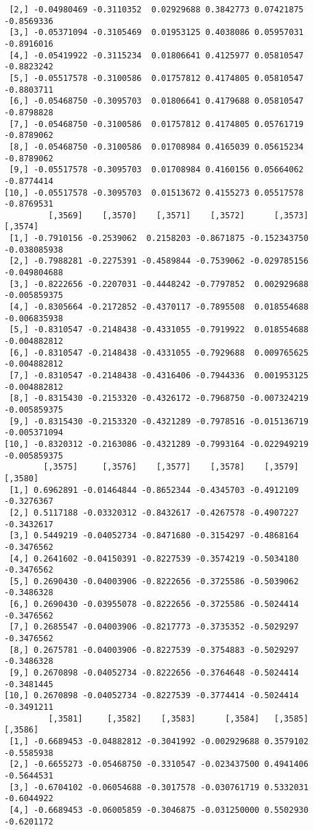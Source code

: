 \documentclass[
  letterpaper,
  DIV=11,
  numbers=noendperiod]{scrreprt}
\begin{document}
\begin{verbatim}
 [2,] -0.04980469 -0.3110352  0.02929688 0.3842773 0.07421875 -0.8569336
 [3,] -0.05371094 -0.3105469  0.01953125 0.4038086 0.05957031 -0.8916016
 [4,] -0.05419922 -0.3115234  0.01806641 0.4125977 0.05810547 -0.8823242
 [5,] -0.05517578 -0.3100586  0.01757812 0.4174805 0.05810547 -0.8803711
 [6,] -0.05468750 -0.3095703  0.01806641 0.4179688 0.05810547 -0.8798828
 [7,] -0.05468750 -0.3100586  0.01757812 0.4174805 0.05761719 -0.8789062
 [8,] -0.05468750 -0.3100586  0.01708984 0.4165039 0.05615234 -0.8789062
 [9,] -0.05517578 -0.3095703  0.01708984 0.4160156 0.05664062 -0.8774414
[10,] -0.05517578 -0.3095703  0.01513672 0.4155273 0.05517578 -0.8769531
         [,3569]    [,3570]    [,3571]    [,3572]      [,3573]      [,3574]
 [1,] -0.7910156 -0.2539062  0.2158203 -0.8671875 -0.152343750 -0.038085938
 [2,] -0.7988281 -0.2275391 -0.4589844 -0.7539062 -0.029785156 -0.049804688
 [3,] -0.8222656 -0.2207031 -0.4448242 -0.7797852  0.002929688 -0.005859375
 [4,] -0.8305664 -0.2172852 -0.4370117 -0.7895508  0.018554688 -0.006835938
 [5,] -0.8310547 -0.2148438 -0.4331055 -0.7919922  0.018554688 -0.004882812
 [6,] -0.8310547 -0.2148438 -0.4331055 -0.7929688  0.009765625 -0.004882812
 [7,] -0.8310547 -0.2148438 -0.4316406 -0.7944336  0.001953125 -0.004882812
 [8,] -0.8315430 -0.2153320 -0.4326172 -0.7968750 -0.007324219 -0.005859375
 [9,] -0.8315430 -0.2153320 -0.4321289 -0.7978516 -0.015136719 -0.005371094
[10,] -0.8320312 -0.2163086 -0.4321289 -0.7993164 -0.022949219 -0.005859375
        [,3575]     [,3576]    [,3577]    [,3578]    [,3579]    [,3580]
 [1,] 0.6962891 -0.01464844 -0.8652344 -0.4345703 -0.4912109 -0.3276367
 [2,] 0.5117188 -0.03320312 -0.8432617 -0.4267578 -0.4907227 -0.3432617
 [3,] 0.5449219 -0.04052734 -0.8471680 -0.3154297 -0.4868164 -0.3476562
 [4,] 0.2641602 -0.04150391 -0.8227539 -0.3574219 -0.5034180 -0.3476562
 [5,] 0.2690430 -0.04003906 -0.8222656 -0.3725586 -0.5039062 -0.3486328
 [6,] 0.2690430 -0.03955078 -0.8222656 -0.3725586 -0.5024414 -0.3476562
 [7,] 0.2685547 -0.04003906 -0.8217773 -0.3735352 -0.5029297 -0.3476562
 [8,] 0.2675781 -0.04003906 -0.8227539 -0.3754883 -0.5029297 -0.3486328
 [9,] 0.2670898 -0.04052734 -0.8222656 -0.3764648 -0.5024414 -0.3481445
[10,] 0.2670898 -0.04052734 -0.8227539 -0.3774414 -0.5024414 -0.3491211
         [,3581]     [,3582]    [,3583]      [,3584]   [,3585]    [,3586]
 [1,] -0.6689453 -0.04882812 -0.3041992 -0.002929688 0.3579102 -0.5585938
 [2,] -0.6655273 -0.05468750 -0.3310547 -0.023437500 0.4941406 -0.5644531
 [3,] -0.6704102 -0.06054688 -0.3017578 -0.030761719 0.5332031 -0.6044922
 [4,] -0.6689453 -0.06005859 -0.3046875 -0.031250000 0.5502930 -0.6201172

\end{verbatim}
\end{document}

